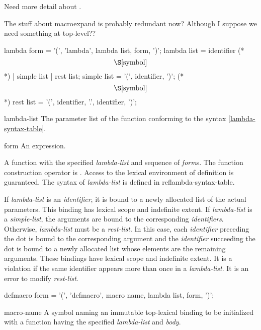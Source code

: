 \label{function}
%
\begin{optPrivate}
    Need more detail about .

    The stuff about macroexpand is probably redundant now?  Although I
    suppose we need something at top-level??
\end{optPrivate}
%
\begin{optDefinition}
%
%
\Syntax
\label{lambda-syntax-table}
\savesyntax\lambdaSyntax\vbox{\small\syntax
lambda form
   = '(', 'lambda', lambda list, {form}, ')';
lambda list
   = identifier     (* \[\S\ref{symbol}\] *)
   | simple list
   | rest list;
simple list
   = '(', {identifier}, ')';   (* \[\S\ref{symbol}\] *)
rest list
   = '(', {identifier}, '.', identifier, ')';
\endsyntax}
%
\begin{arguments}
    \item[lambda-list] The parameter list of the function conforming to the
    syntax \ref{lambda-syntax-table}.
    \item[form] An expression.
\end{arguments}
%
\result%
A function with the specified {\em lambda-list\/} and sequence of {\em
form\/}s.
%
\remarks%
The function construction operator is .  Access to the
lexical environment of definition is guaranteed.  The syntax of {\em
    lambda-list} is defined in ref{lambda-syntax-table}.

If {\em lambda-list} is an {\em identifier}, it is bound to a newly allocated
list of the actual parameters.  This binding has lexical scope and indefinite extent.  If
{\em lambda-list} is a {\em simple-list}, the arguments are bound to the
corresponding {\em identifiers}.  Otherwise, {\em lambda-list} must be a {\em
    rest-list}.  In this case, each {\em identifier} preceding the dot is bound
to the corresponding argument and the {\em identifier} succeeding the dot is
bound to a newly allocated list whose elements are the remaining arguments.
These bindings have lexical scope and indefinite extent.  It is a violation
if the same identifier appears more than once in a {\em lambda-list}.  It is an
error to modify {\em rest-list}.

%
\Syntax
\savesyntax{}\vbox{\small\syntax
defmacro form
   = '(', 'defmacro', macro name, lambda list,
     {form}, ')';
\endsyntax}
%
\begin{arguments}
    \item[macro-name] A symbol naming an immutable top-lexical binding to be
    initialized with a function having the specified {\em lambda-list} and {\em
        body}.


\end{arguments}
\end{optDefinition}
